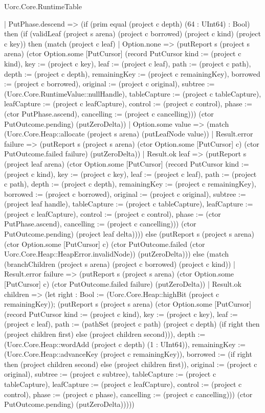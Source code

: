 \begin{lexlean}{Uorc.Core.RuntimeTable}
\begin{semanticmodule}
{      | PutPhase.descend => (if (prim equal (project c depth) (64 : UInt64) : Bool) then (if (validLeaf (project s arena) (project c borrowed) (project c kind) (project c key)) then (match (project c leaf)
        | Option.none => (putReport s (project s arena) (ctor Option.some [PutCursor] (record PutCursor {kind := (project c kind), key := (project c key), leaf := (project c leaf), path := (project c path), depth := (project c depth), remainingKey := (project c remainingKey), borrowed := (project c borrowed), original := (project c original), subtree := (Uorc.Core.RuntimeValue::nullHandle), tableCapture := (project c tableCapture), leafCapture := (project c leafCapture), control := (project c control), phase := (ctor PutPhase.ascend), cancelling := (project c cancelling)})) (ctor PutOutcome.pending) (putZeroDelta))
        | Option.some value => (match (Uorc.Core.Heap::allocate (project s arena) (putLeafNode value))
          | Result.error failure => (putReport s (project s arena) (ctor Option.some [PutCursor] c) (ctor PutOutcome.failed failure) (putZeroDelta))
          | Result.ok leaf => (putReport s (project leaf arena) (ctor Option.some [PutCursor] (record PutCursor {kind := (project c kind), key := (project c key), leaf := (project c leaf), path := (project c path), depth := (project c depth), remainingKey := (project c remainingKey), borrowed := (project c borrowed), original := (project c original), subtree := (project leaf handle), tableCapture := (project c tableCapture), leafCapture := (project c leafCapture), control := (project c control), phase := (ctor PutPhase.ascend), cancelling := (project c cancelling)})) (ctor PutOutcome.pending) (project leaf delta)))) else (putReport s (project s arena) (ctor Option.some [PutCursor] c) (ctor PutOutcome.failed (ctor Uorc.Core.Heap::HeapError.invalidNode)) (putZeroDelta))) else (match (branchChildren (project s arena) (project c borrowed) (project c kind))
        | Result.error failure => (putReport s (project s arena) (ctor Option.some [PutCursor] c) (ctor PutOutcome.failed failure) (putZeroDelta))
        | Result.ok children => (let right : Bool := (Uorc.Core.Heap::highBit (project c remainingKey)); (putReport s (project s arena) (ctor Option.some [PutCursor] (record PutCursor {kind := (project c kind), key := (project c key), leaf := (project c leaf), path := (pathSet (project c path) (project c depth) (if right then (project children first) else (project children second))), depth := (Uorc.Core.Heap::wordAdd (project c depth) (1 : UInt64)), remainingKey := (Uorc.Core.Heap::advanceKey (project c remainingKey)), borrowed := (if right then (project children second) else (project children first)), original := (project c original), subtree := (project c subtree), tableCapture := (project c tableCapture), leafCapture := (project c leafCapture), control := (project c control), phase := (project c phase), cancelling := (project c cancelling)})) (ctor PutOutcome.pending) (putZeroDelta)))))
}
\end{semanticmodule}
\end{lexlean}
